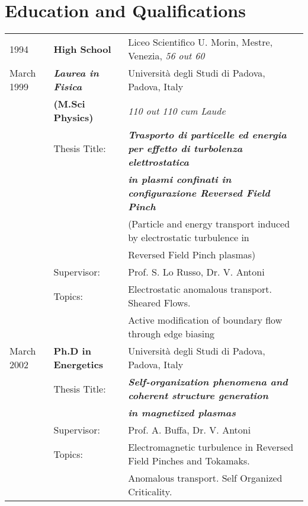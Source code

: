 \section{Education and Qualifications}
\begin{tabular}{lll}
1994 & \textbf{ High School} & Liceo Scientifico U. Morin, Mestre, Venezia,
\textit{56 out 60}\\
March 1999 & \textbf{\textit{Laurea in Fisica} } &
Universit\`a degli Studi di Padova, Padova, Italy \\
 & \textbf{(M.Sci Physics)} & \textit{110 out 110 cum Laude} \\
 &Thesis Title:  & \textbf{\emph{Trasporto di particelle ed energia per effetto
 di turbolenza elettrostatica}} \\
& & \textbf{\emph{in plasmi confinati in configurazione
 Reversed Field Pinch}} \\ 
& & (Particle and energy transport induced by
electrostatic turbulence in \\
& &  Reversed Field Pinch  plasmas) \\ 
& Supervisor: & Prof. S. Lo Russo, Dr. V. Antoni \\
 & Topics: & Electrostatic anomalous transport. Sheared Flows. \\ 
& & Active
 modification of boundary flow through edge biasing \\
 March 2002 & \textbf{Ph.D in Energetics} & Universit\`a degli Studi di Padova, Padova,
Italy \\
& Thesis Title: & \textbf{\emph{Self-organization phenomena and
    coherent structure generation}} \\
 & & \textbf{\emph{in magnetized plasmas}} \\
 & Supervisor: & Prof. A. Buffa, Dr. V. Antoni \\ 
 & Topics: & Electromagnetic turbulence in Reversed Field Pinches and Tokamaks. \\
& & Anomalous transport. Self Organized Criticality.
\end{tabular}
